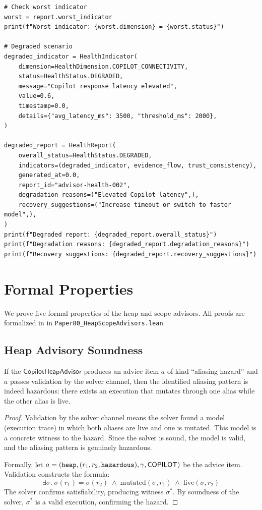 \documentclass[11pt]{article}
\newcommand{\HeapAdv}{\mathsf{CopilotHeapAdvisor}}
\begin{document}
\begin{lstlisting}[style=jugeo-python, caption={Health monitoring for the advisor subsystem.}, label=lst:health]
# Check worst indicator
worst = report.worst_indicator
print(f"Worst indicator: {worst.dimension} = {worst.status}")

# Degraded scenario
degraded_indicator = HealthIndicator(
    dimension=HealthDimension.COPILOT_CONNECTIVITY,
    status=HealthStatus.DEGRADED,
    message="Copilot response latency elevated",
    value=0.6,
    timestamp=0.0,
    details={"avg_latency_ms": 3500, "threshold_ms": 2000},
)

degraded_report = HealthReport(
    overall_status=HealthStatus.DEGRADED,
    indicators=(degraded_indicator, evidence_flow, trust_consistency),
    generated_at=0.0,
    report_id="advisor-health-002",
    degradation_reasons=("Elevated Copilot latency",),
    recovery_suggestions=("Increase timeout or switch to faster model",),
)
print(f"Degraded report: {degraded_report.overall_status}")
print(f"Degradation reasons: {degraded_report.degradation_reasons}")
print(f"Recovery suggestions: {degraded_report.recovery_suggestions}")
\end{lstlisting}

\section{Formal Properties}
\label{sec:formal}

We prove five formal properties of the heap and scope advisors.
All proofs are formalized in \LEAN{} in
\texttt{Paper80\_HeapScopeAdvisors.lean}.

\subsection{Heap Advisory Soundness}
\label{sec:formal:heap}

\begin{theorem}
\label{thm:heap-sound}
If the $\HeapAdv$ produces an advice item $a$ of kind
``aliasing hazard'' and $a$ passes validation by the solver
channel, then the identified aliasing pattern is indeed
hazardous: there exists an execution that mutates through
one alias while the other alias is live.
\end{theorem}

\begin{proof}
Validation by the solver channel means the solver found a model
(execution trace) in which both aliases are live and one is mutated.
This model is a concrete witness to the hazard.  Since the solver
is sound, the model is valid, and the aliasing pattern is
genuinely hazardous.

Formally, let $a = (\texttt{heap}, (r_1, r_2, \texttt{hazardous}), \gamma, \mathsf{COPILOT})$
be the advice item.  Validation constructs the formula:
\[
  \exists \sigma.\; \sigma(r_1) = \sigma(r_2)
  \;\wedge\; \mathrm{mutated}(\sigma, r_1)
  \;\wedge\; \mathrm{live}(\sigma, r_2)
\]
The solver confirms satisfiability, producing witness $\sigma^*$.
By soundness of the solver, $\sigma^*$ is a valid execution,
confirming the hazard.
\end{proof}
\end{document}
